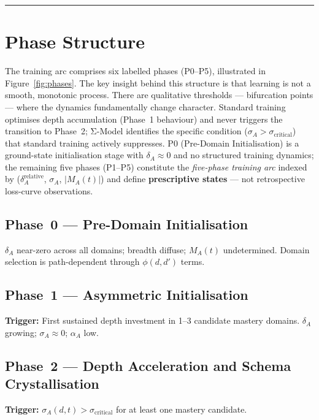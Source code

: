 \documentclass[11pt,a4paper]{article}
\begin{document}
\noindent\rule{\linewidth}{0.4pt}

\section{Phase Structure}\label{sec:phase-structure}

The training arc comprises six labelled phases (P0--P5), illustrated in Figure~\ref{fig:phases}. The key insight behind this structure is that learning is not a smooth, monotonic process. There are qualitative thresholds --- bifurcation points --- where the dynamics fundamentally change character. Standard training optimises depth accumulation (Phase~1 behaviour) and never triggers the transition to Phase~2; Σ-Model identifies the specific condition ($\sigma_A > \sigma_{\text{critical}}$) that standard training actively suppresses. P0
(Pre-Domain Initialisation) is a ground-state initialisation stage
with $\delta_A \approx 0$ and no structured training dynamics; the
remaining five phases (P1--P5) constitute the \emph{five-phase
training arc} indexed by
($\delta_A^{\text{relative}}$, $\sigma_A$, $|M_A(t)|$) and define
\textbf{prescriptive states} --- not retrospective loss-curve
observations.

\subsection*{Phase~0 --- Pre-Domain Initialisation}

$\delta_A$ near-zero across all domains; breadth diffuse; $M_A(t)$
undetermined. Domain selection is path-dependent through $\phi(d,d')$
terms.

\subsection*{Phase~1 --- Asymmetric Initialisation}

\textbf{Trigger:} First sustained depth investment in 1--3 candidate
mastery domains. $\delta_A$ growing; $\sigma_A \approx 0$; $\alpha_A$
low.

\subsection*{Phase~2 --- Depth Acceleration and Schema Crystallisation}

\textbf{Trigger:} $\sigma_A(d,t) > \sigma_{\text{critical}}$ for at
least one mastery candidate.
\end{document}
